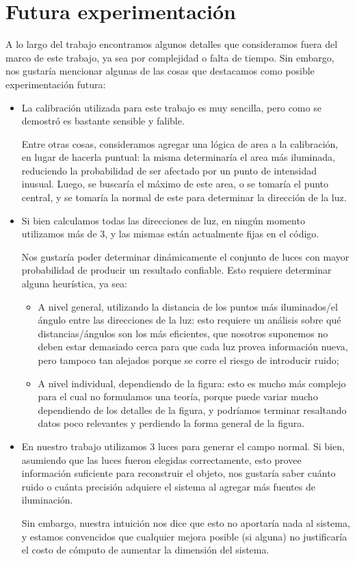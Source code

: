 \section{Futura experimentación}

A lo largo del trabajo encontramos algunos detalles que consideramos
fuera del marco de este trabajo, ya sea por complejidad o falta de tiempo.
Sin embargo, nos gustaría mencionar algunas de las cosas que destacamos como
posible experimentación futura:

\begin{itemize}
	\item La calibración utilizada para este trabajo es muy sencilla, pero como
	se demostró es bastante sensible y falible.

	Entre otras cosas, consideramos agregar una lógica de area a la calibración,
	en lugar de hacerla puntual: la misma determinaría el area más iluminada,
	reduciendo la probabilidad de ser afectado por un punto de intensidad
	inusual. Luego, se buscaría el máximo de este area, o se tomaría el
	punto central, y se tomaría la normal de este para determinar la
	dirección de la luz.

	\item Si bien calculamos todas las direcciones de luz, en ningún momento
	utilizamos más de 3, y las mismas están actualmente fijas en el código.

	Nos gustaría poder determinar dinámicamente el conjunto de luces con mayor
	probabilidad de producir un resultado confiable. Esto requiere determinar
	alguna heurística, ya sea:

	\begin{itemize}
		\item A nivel general, utilizando la distancia de los puntos más iluminados/el
		ángulo entre las direcciones de la luz: esto requiere un análisis sobre
		qué distancias/ángulos son los más eficientes, que nosotros suponemos no
		deben estar demasiado cerca para que cada luz provea información nueva,
		pero tampoco tan alejados porque se corre el riesgo de introducir ruido;

		\item A nivel individual, dependiendo de la figura: esto es mucho más complejo
		para el cual no formulamos una teoría, porque puede variar mucho dependiendo
		de los detalles de la figura, y podríamos terminar resaltando datos poco
		relevantes y perdiendo la forma general de la figura.
	\end{itemize}

	\item En nuestro trabajo utilizamos 3 luces para generar el campo normal.
	Si bien, asumiendo que las luces fueron elegidas correctamente, esto provee
	información suficiente para reconstruir el objeto, nos gustaría saber
	cuánto ruido o cuánta precisión adquiere el sistema al agregar más fuentes
	de iluminación.

	Sin embargo, nuestra intuición nos dice que esto no aportaría nada al sistema,
	y estamos convencidos que cualquier mejora posible (si alguna)
	no justificaría el costo de cómputo de aumentar la dimensión del sistema.
\end{itemize}
